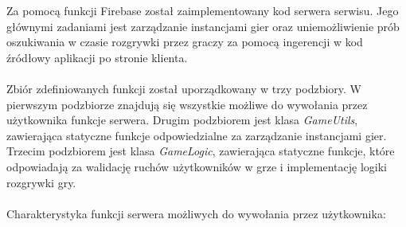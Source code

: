 Za pomocą funkcji Firebase został zaimplementowany kod serwera serwisu. Jego głównymi zadaniami jest zarządzanie instancjami gier oraz uniemożliwienie prób oszukiwania w czasie rozgrywki przez graczy za pomocą ingerencji w kod źródłowy aplikacji po stronie klienta. \\ \\
Zbiór zdefiniowanych funkcji został uporządkowany w trzy podzbiory. W pierwszym podzbiorze znajdują się wszystkie możliwe do wywołania przez użytkownika funkcje serwera. Drugim podzbiorem jest klasa \emph{GameUtils}, zawierająca statyczne funkcje odpowiedzialne za zarządzanie instancjami gier. Trzecim podzbiorem jest klasa \emph{GameLogic}, zawierająca statyczne funkcje, które odpowiadają za walidację ruchów użytkowników w grze i implementację logiki rozgrywki gry. \\ \\
Charakterystyka funkcji serwera możliwych do wywołania przez użytkownika:
